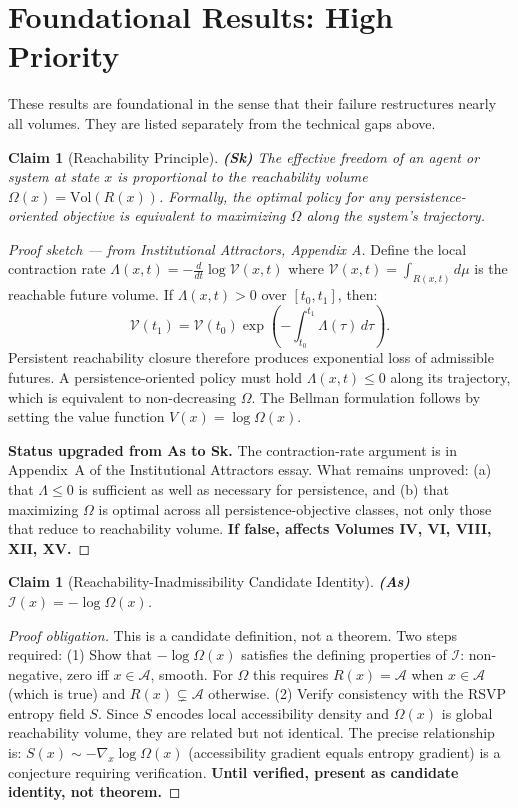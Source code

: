 \documentclass[11pt, a4paper]{book}
\theoremstyle{flyxion}
\newtheorem{claim}[theorem]{Claim}
\theoremstyle{remark}
\begin{document}
\section{Foundational Results: High Priority}

These results are foundational in the sense that their failure
restructures nearly all volumes. They are listed separately from
the technical gaps above.

\begin{claim}[Reachability Principle] \textbf{(Sk)}
\label{claim:rp}
The effective freedom of an agent or system at state $x$ is
proportional to the reachability volume $\Omega(x) =
\mathrm{Vol}(R(x))$. Formally, the optimal policy for any
persistence-oriented objective is equivalent to maximizing
$\Omega$ along the system's trajectory.
\end{claim}
\begin{proof}[Proof sketch --- from Institutional Attractors, Appendix A]
Define the local contraction rate
$\Lambda(x,t) = -\frac{d}{dt}\log\mathcal{V}(x,t)$
where $\mathcal{V}(x,t) = \int_{R(x,t)}d\mu$ is the reachable
future volume. If $\Lambda(x,t) > 0$ over $[t_0,t_1]$, then:
\[
\mathcal{V}(t_1) = \mathcal{V}(t_0)\exp\!\left(
  -\int_{t_0}^{t_1}\Lambda(\tau)\,d\tau\right).
\]
Persistent reachability closure therefore produces exponential
loss of admissible futures. A persistence-oriented policy must
hold $\Lambda(x,t) \leq 0$ along its trajectory, which is
equivalent to non-decreasing $\Omega$. The Bellman formulation
follows by setting the value function $V(x) = \log\Omega(x)$.

\textbf{Status upgraded from As to Sk.} The contraction-rate
argument is in Appendix~A of the Institutional Attractors essay.
What remains unproved: (a) that $\Lambda \leq 0$ is sufficient
as well as necessary for persistence, and (b) that maximizing
$\Omega$ is optimal across all persistence-objective classes, not
only those that reduce to reachability volume.
\textbf{If false, affects Volumes IV, VI, VIII, XII, XV.}
\end{proof}

\begin{claim}[Reachability-Inadmissibility Candidate Identity] \textbf{(As)}
\label{claim:ident}
$\mathcal{I}(x) = -\log\Omega(x)$.
\end{claim}
\begin{proof}[Proof obligation]
This is a candidate definition, not a theorem. Two steps required:
(1) Show that $-\log\Omega(x)$ satisfies the defining properties
of $\mathcal{I}$: non-negative, zero iff $x \in \mathcal{A}$, smooth.
For $\Omega$ this requires $R(x) = \mathcal{A}$ when $x \in \mathcal{A}$
(which is true) and $R(x) \subsetneq \mathcal{A}$ otherwise.
(2) Verify consistency with the RSVP entropy field $S$. Since $S$
encodes local accessibility density and $\Omega(x)$ is global
reachability volume, they are related but not identical. The
precise relationship is: $S(x) \sim -\nabla_x\log\Omega(x)$
(accessibility gradient equals entropy gradient) is a conjecture
requiring verification. \textbf{Until verified, present as
candidate identity, not theorem.}
\end{proof}
\end{document}
